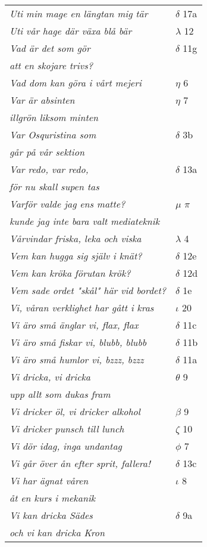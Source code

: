 \documentclass[a6paper,10pt]{article}
\begin{document}
\newpage
\begin{table}[!h]
\begin{tabular}{l l}
\textit{Uti min mage en längtan mig tär}	&$\delta$ 17a\\
\textit{Uti vår hage där växa blå bär}	&$\lambda$ 12\\
\textit{Vad är det som gör}	&$\delta$ 11g\\
\textit{att en skojare trivs?} &\\
\textit{Vad dom kan göra i vårt mejeri}	&$\eta$ 6\\
\textit{Var är absinten}	&$\eta$ 7\\
\textit{illgrön liksom minten} &\\
\textit{Var Osquristina som}	&$\delta$ 3b\\
\textit{går på vår sektion} &\\
\textit{Var redo, var redo,}	&$\delta$ 13a\\
\textit{för nu skall supen tas} &\\
\textit{Varför valde jag ens matte?} &$\mu$ $\pi$\\
\textit{kunde jag inte bara valt mediateknik} &\\
\textit{Vårvindar friska, leka och viska}	&$\lambda$ 4\\
\textit{Vem kan hugga sig själv i knät?}	&$\delta$ 12e\\
\textit{Vem kan kröka förutan krök?}	&$\delta$ 12d\\
\textit{Vem sade ordet "skål" här vid bordet?}	&$\delta$ 1e\\
\textit{Vi, våran verklighet har gått i kras}&$\iota$ 20\\
\textit{Vi äro små änglar vi, flax, flax}	&$\delta$ 11c\\
\textit{Vi äro små fiskar vi, blubb, blubb}	&$\delta$ 11b\\
\textit{Vi äro små humlor vi, bzzz, bzzz}	&$\delta$ 11a\\
\textit{Vi dricka, vi dricka}	&$\theta$ 9\\
\textit{upp allt som dukas fram} &\\
\textit{Vi dricker öl, vi dricker alkohol}	&$\beta$ 9\\
\textit{Vi dricker punsch till lunch}	&$\zeta$ 10\\
\textit{Vi dör idag, inga undantag} &$\phi$ 7\\
\textit{Vi går över ån efter sprit, fallera!}	&$\delta$ 13c\\
\textit{Vi har ägnat våren}	&$\iota$ 8\\
\textit{åt en kurs i mekanik} &\\
\textit{Vi kan dricka Sädes}	&$\delta$ 9a\\
\textit{och vi kan dricka Kron} &\\
\end{tabular}
\end{table}
\end{document}
